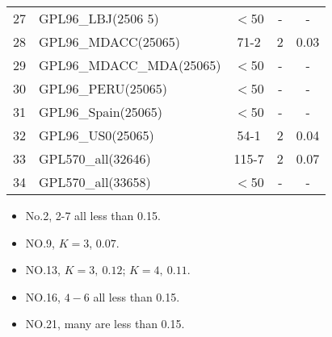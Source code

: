 \documentclass[12pt]{article}
\begin{document}
\begin{longtable}{c|l|ccc}
  27 & GPL96\_LBJ(2506 5) & $<$50 & -&- \\
  28 & GPL96\_MDACC(25065) & 71-2 & 2 & 0.03 \\
  29 & GPL96\_MDACC\_MDA(25065) & $<$50 & -&- \\
  30 & GPL96\_PERU(25065) & $<$50 & -&- \\
  31 & GPL96\_Spain(25065) & $<$50 & -&- \\
  32 & GPL96\_US0(25065) & 54-1 & 2 & 0.04 \\
  33 & GPL570\_all(32646) & 115-7 & 2 & 0.07 \\
  34 & GPL570\_all(33658) & $<$50 & -&- \\
  \hline
\end{longtable}

\begin{itemize}
\item No.2, 2-7 all less than 0.15.
\item NO.9, $K=3$, $0.07$.
\item NO.13, $K=3,\ 0.12$; $K=4,\ 0.11$.
\item NO.16, $4-6$ all less than 0.15.
  \item NO.21, many are less than 0.15.
\end{itemize}
\end{document}

